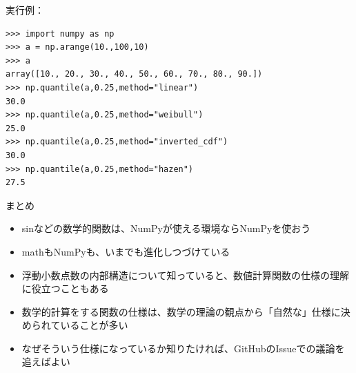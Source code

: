 \documentclass[unicode,lualatex,aspectratio=169]{beamer}
\begin{document}
\begin{frame}[fragile]
  
  実行例：

{\fontsize{8pt}{8pt}\selectfont
\begin{verbatim}
>>> import numpy as np
>>> a = np.arange(10.,100,10)
>>> a
array([10., 20., 30., 40., 50., 60., 70., 80., 90.])
>>> np.quantile(a,0.25,method="linear")
30.0
>>> np.quantile(a,0.25,method="weibull")
25.0
>>> np.quantile(a,0.25,method="inverted_cdf")
30.0
>>> np.quantile(a,0.25,method="hazen")
27.5
\end{verbatim}
}
\end{frame}
\begin{frame}[fragile]{まとめ}
  \begin{itemize}
  \item sinなどの数学的関数は、NumPyが使える環境ならNumPyを使おう
  \item mathもNumPyも、いまでも進化しつづけている
  \item 浮動小数点数の内部構造について知っていると、数値計算関数の仕様の理解に役立つこともある
  \item 数学的計算をする関数の仕様は、数学の理論の観点から「自然な」仕様に決められていることが多い
  \item なぜそういう仕様になっているか知りたければ、GitHubのIssueでの議論を追えばよい
  \end{itemize}
\end{frame}
\end{document}

